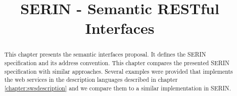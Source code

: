 \documentclass{singlecol-new}
\theoremstyle{TH}{
\newtheorem{lemma}{Lemma}
\newtheorem{theorem}[lemma]{Theorem}
\newtheorem{corrolary}[lemma]{Corrolary}
\newtheorem{conjecture}[lemma]{Conjecture}
\newtheorem{proposition}[lemma]{Proposition}
\newtheorem{claim}[lemma]{Claim}
\newtheorem{stheorem}[lemma]{Wrong Theorem}
\newtheorem{algorithm}{Algorithm}
}
\theoremstyle{THrm}{
\newtheorem{definition}{Definition}[section]
\newtheorem{question}{Question}[section]
\newtheorem{remark}{Remark}
\newtheorem{scheme}{Scheme}
}
\theoremstyle{THhit}{
\newtheorem{case}{Case}[section]
}
\begin{document}
%

\setcounter{page}{1}






\BottomCatch

\CLline

\subtitle{}

\title{SERIN - Semantic RESTful Interfaces}

%
%
%
%
%

%
%
%
%
%
%
%

\begin{abstract}
This chapter presents the semantic interfaces proposal. It defines the SERIN specification and its address convention.
This chapter compares the presented SERIN specification with similar approaches. Several examples were provided that implements the web services in the description languages described in chapter \ref{chapter:swsdescription} and we compare them to a similar implementation in SERIN.
\end{abstract}

\end{document}
